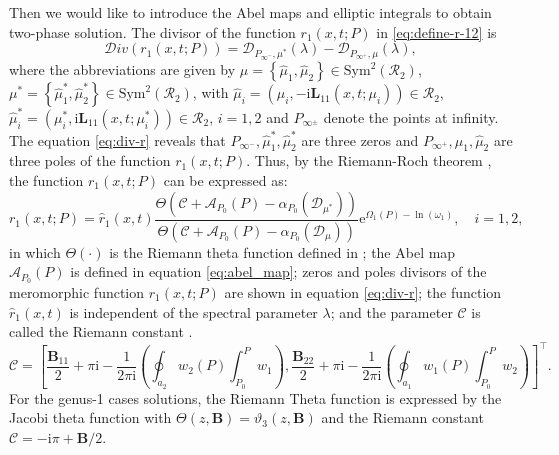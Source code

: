 \documentclass[11pt,reqno]{amsart}
\newcommand{\ii}{\mathrm{i}}
\newcommand{\ee}{\mathrm{e}}
\numberwithin{equation}{section}
\begin{document}
Then we would like to introduce the Abel maps and elliptic integrals to obtain two-phase solution.
The divisor of the function $r_{1}(x,t;P)$ in \eqref{eq:define-r-12} is 
\begin{equation}\label{eq:div-r}
	\mathcal{D}iv\left(r_{1}(x,t;P)\right)=\mathcal{D}_{P_{\infty^{-}},\mu^*}(\lambda)-\mathcal{D}_{P_{\infty^{+}},\mu}(\lambda), 
\end{equation}
	where the abbreviations are given by $\mu=\left\{\hat{\mu}_1,\hat{\mu}_2\right\}\in \mathrm{Sym}^2(\mathcal{R}_2)$, $\mu^*=\left\{\hat{\mu}_1^*,\hat{\mu}_2^*\right\} \in \mathrm{Sym}^2(\mathcal{R}_2)$,
with $\hat{\mu}_i=(\mu_i,-\ii \mathbf{L}_{11}(x,t;\mu_i))\in \mathcal{R}_2$, 
$\hat{\mu}_i^*=(\mu_i^*,\ii \mathbf{L}_{11}(x,t;\mu_i^*))\in \mathcal{R}_2$, $i=1,2$ and $P_{\infty^{\pm}}$ denote the points at infinity.
The equation \eqref{eq:div-r} reveals that $P_{\infty^{-}}, \hat{\mu}_1^*,\hat{\mu}_2^*$ are three zeros and $P_{\infty^{+}}, \hat{\mu}_1,\hat{\mu}_2$ are three poles of the function $r_1(x,t;P)$.
Thus, by the Riemann-Roch theorem \cite{FritzH-2003-Algebro-Geometric}, the function $r_1(x,t;P)$ can be expressed as:
\begin{equation}\label{eq:define-r1}
	r_1(x,t;P)= \hat{r}_1(x,t)\frac{\Theta(\mathcal{C}+\mathcal{A}_{P_0}(P)-\alpha_{P_0}(\mathcal{D}_{\mu^*}))}{\Theta(\mathcal{C}+\mathcal{A}_{P_0}(P)-\alpha_{P_0}(\mathcal{D}_{\mu}))}\ee^{\Omega_1(P) -\ln(\omega_1 )}, \quad i=1,2,
\end{equation}
in which $\Theta(\cdot)$ is the Riemann theta function defined in ; the Abel map $\mathcal{A}_{P_0}(P)$ is defined in equation \eqref{eq:abel_map};  zeros and poles divisors of the meromorphic function $r_1(x,t;P)$ are shown in equation \eqref{eq:div-r};
the function $\hat{r}_1(x,t)$ is independent of the spectral parameter $\lambda$; and the parameter $\mathcal{C}$ is called the Riemann constant \cite[p.41]{BelokolosBEI-94}.
\begin{equation}\label{eq:Riemann-constants}
	\mathcal{C}=\left[\frac{\mathbf{B}_{11}}{2}+\pi \ii -\frac{1}{2\pi \ii } \left(\oint_{a_2} w_2(P) \int_{P_0}^{P}w_1 \right), \frac{\mathbf{B}_{22}}{2}+\pi \ii -\frac{1}{2\pi \ii } \left(\oint_{a_1} w_1(P) \int_{P_0}^{P}w_2 \right) \right]^{\top}. 
\end{equation}
For the genus-1 cases solutions, the Riemann Theta function is expressed by the Jacobi theta function with $\Theta(z,\mathbf{B})=\vartheta_3(z,\mathbf{B})$ and the Riemann constant $\mathcal{C}=-\ii\pi + \mathbf{B}/2$.
\end{document}
